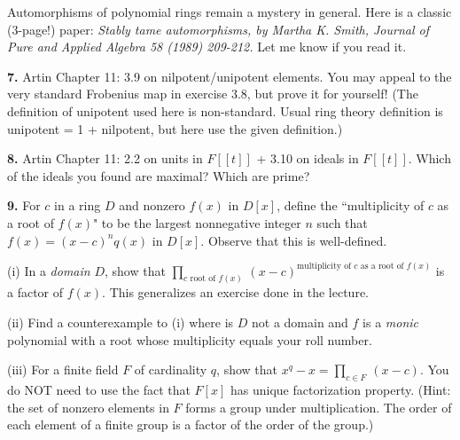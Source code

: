 \documentclass{article}
\begin{document}
\medskip

Automorphisms of polynomial rings remain a mystery in general. Here is a classic (3-page!) paper: 
{\it Stably tame automorphisms, by Martha K. Smith, Journal of Pure and Applied Algebra 58 (1989) 209-212.} 
Let me know if you read it.

\medskip

{\bf 7.}  Artin Chapter 11: 3.9 on nilpotent/unipotent elements. You may appeal to the very standard Frobenius map in exercise 3.8, but prove it for yourself! (The definition of unipotent used here is non-standard. Usual ring theory definition is unipotent = 1 + nilpotent, but here use the given definition.)

\medskip

{\bf 8.}	Artin Chapter 11: 2.2 on units in $F[[t]]$ +  3.10 on ideals in $F[[t]]$. Which of the ideals you found are maximal? Which are prime?

\medskip

{\bf 9.}  For $c$ in a ring $D$ and nonzero $f(x)$ in $D[x]$, define the ``multiplicity of $c$ as a root of $f(x)$" to be the largest nonnegative integer $n$ such that $f(x) = (x-c)^n q(x)$ in $D[x]$. Observe that this is well-defined. 

\medskip

(i) In a {\it domain} $D$, show that $\prod_{c \text { root of } f(x)} \, (x - c )^{\text {multiplicity of } c \text { as a root of } f(x)}$ is a factor of  $f(x)$. This generalizes an exercise done in the lecture.

\medskip
	
(ii) Find a counterexample to (i) where is $D$ not a domain and $f$ is a {\it monic} polynomial with a root whose multiplicity equals your roll number.

\medskip

(iii)	For a finite field $F$ of cardinality $q$, show that $x^q - x  = \prod_{c \in F} \, (x - c)$. You do NOT need to use the fact that $F[x]$ has unique factorization property. (Hint: the set of nonzero elements in $F$ forms a group under multiplication. The order of each element of a finite group is a factor of the order of the group.)
\end{document}
